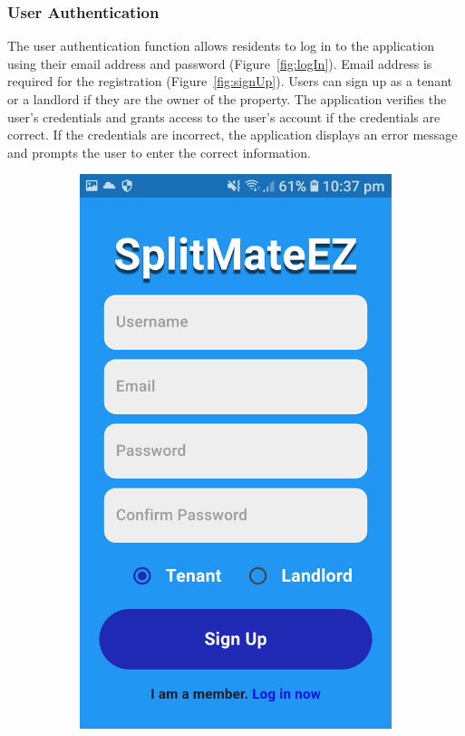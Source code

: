 \documentclass[sigconf,nonacm]{acmart}\settopmatter{printfolios=true}
\begin{document}
\subsubsection{\textbf{User Authentication}}
The user authentication function allows residents to log in to the application using their email address and password (Figure~\ref{fig:logIn}). Email address is required for the registration (Figure~\ref{fig:signUp}). Users can sign up as a tenant or a landlord if they are the owner of the property.
The application verifies the user's credentials and grants access to the user's account if the credentials are correct. If the credentials are incorrect, the application displays an error message and prompts the user to enter the correct information.
\begin{figure}[htbp]
  \centering
  \begin{subfigure}{0.24\textwidth}
    \raggedright
    \includegraphics[width=\linewidth]{signUp.jpg}

\end{subfigure}
\end{figure}
\end{document}
